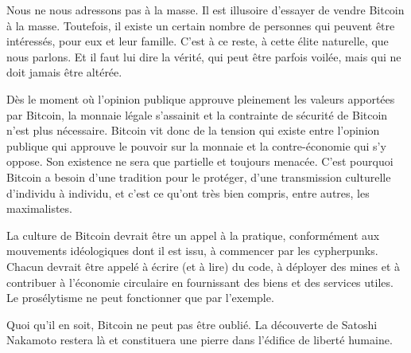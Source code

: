 Nous ne nous adressons pas à la masse. Il est illusoire d'essayer de vendre Bitcoin à la masse. Toutefois, il existe un certain nombre de personnes qui peuvent être intéressés, pour eux et leur famille. C'est à ce reste, à cette élite naturelle, que nous parlons. Et il faut lui dire la vérité, qui peut être parfois voilée, mais qui ne doit jamais être altérée.

Dès le moment où l'opinion publique approuve pleinement les valeurs apportées par Bitcoin, la monnaie légale s'assainit et la contrainte de sécurité de Bitcoin n'est plus nécessaire. Bitcoin vit donc de la tension qui existe entre l'opinion publique qui approuve le pouvoir sur la monnaie et la contre-économie qui s'y oppose. Son existence ne sera que partielle et toujours menacée. C'est pourquoi Bitcoin a besoin d'une tradition pour le protéger, d'une transmission culturelle d'individu à individu, et c'est ce qu'ont très bien compris, entre autres, les maximalistes. %

La culture de Bitcoin devrait être un appel à la pratique, conformément aux mouvements idéologiques dont il est issu, à commencer par les cypherpunks. Chacun devrait être appelé à écrire (et à lire) du code, à déployer des mines et à contribuer à l'économie circulaire en fournissant des biens et des services utiles. Le prosélytisme  ne peut fonctionner que par l'exemple.


Quoi qu'il en soit, Bitcoin ne peut pas être oublié. La découverte de Satoshi Nakamoto restera là et constituera une pierre dans l'édifice de liberté humaine.

